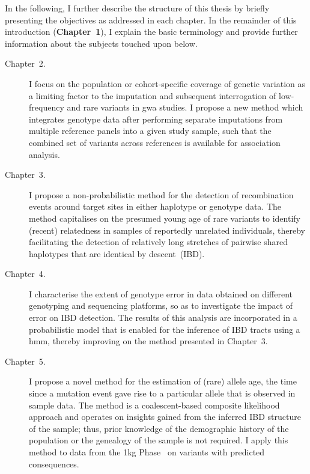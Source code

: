 In the following, I further describe the structure of this thesis by briefly presenting the objectives as addressed in each chapter.
In the remainder of this introduction (\textbf{Chapter~1}), I explain the basic terminology and provide further information about the subjects touched upon below.

\begin{description}
  \item[Chapter~2.] I focus on the population or cohort-specific coverage of genetic variation as a limiting factor to the imputation and subsequent interrogation of low-frequency and rare variants in \gls{gwa} studies.
	I propose a new method which integrates genotype data after performing separate imputations from multiple reference panels into a given study sample, such that the combined set of variants across references is available for association analysis.

  \item[Chapter~3.] I propose a non-probabilistic method for the detection of recombination events around target sites in either haplotype or genotype data.
  The method capitalises on the presumed young age of rare variants to identify (recent) relatedness in samples of reportedly unrelated individuals, thereby facilitating the detection of relatively long stretches of pairwise shared haplotypes that are identical by descent~(IBD).

  \item[Chapter~4.] I characterise the extent of genotype error in data obtained on different genotyping and sequencing platforms, so as to investigate the impact of error on IBD detection.
  The results of this analysis are incorporated in a probabilistic model that is enabled for the inference of IBD tracts using a \gls{hmm}, thereby improving on the method presented in Chapter~3.

  \item[Chapter~5.] I propose a novel method for the estimation of (rare) allele age, \ie the time since a mutation event gave rise to a particular allele that is observed in sample data.
  The method is a coalescent-based composite likelihood approach and operates on insights gained from the inferred IBD structure of the sample; thus, prior knowledge of the demographic history of the population or the genealogy of the sample is not required.
	I apply this method to data from the \gls{1kg} Phase~ on variants with predicted consequences.
\end{description}

